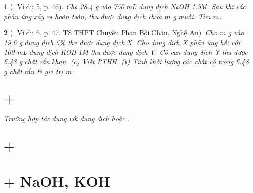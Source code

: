\documentclass{article}
\newtheorem{baitoan}{}
\begin{document}
\begin{baitoan}[\cite{Truong_Long_Huong_bdhsg_Hoa_Hoc_9}, Ví dụ 5, p. 46]
	Cho {\rm28.4 g } vào {\rm750 mL} dung dịch {\rm NaOH 1.5M}. Sau khi các phản ứng xảy ra hoàn toàn, thu được dung dịch chứa $m$ {\rm g} muối. Tìm $m$.
\end{baitoan}

\begin{baitoan}[\cite{Truong_Long_Huong_bdhsg_Hoa_Hoc_9}, Ví dụ 6, p. 47, TS THPT Chuyên Phan Bội Châu, Nghệ An]
	Cho $m$ {\rm g } vào {\rm19.6 g} dung dịch {\rm{} 5\%} thu được dung dịch X. Cho dung dịch X phản ứng hết với {\rm100 mL} dung dịch {\rm KOH 1M} thu được dung dịch Y. Cô cạn dung dịch Y thu được {\rm6.48 g} chất rắn khan. (a) Viết {\rm PTHH}. (b) Tính khối lượng các chất có trong {\rm6.48 g} chất rắn \& giá trị $m$.
\end{baitoan}


\section{ $+$ }
\textit{Trường hợp  tác dụng với dung dịch  hoặc .}


\section{ $+$ }


\section{ $+$ NaOH, KOH}


\printbibliography[heading=bibintoc]
\end{document}
